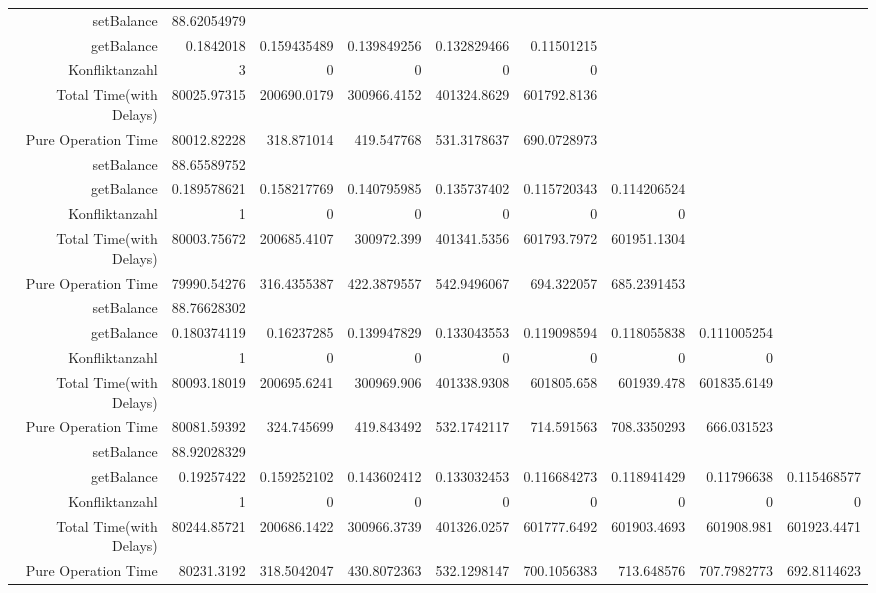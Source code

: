 \begin{landscape}
\begin{table}[htbp]
\begin{tabular}{rrrrrrrrr}
    \cline{1-9}
    setBalance & 88.62054979 &       &       &       &       &       &       &  \\
    getBalance & 0.1842018 & 0.159435489 & 0.139849256 & 0.132829466 & 0.11501215 &       &       &  \\
    Konfliktanzahl & 3     & 0     & 0     & 0     & 0     &       &       &  \\
    Total Time(with Delays) & 80025.97315 & 200690.0179 & 300966.4152 & 401324.8629 & 601792.8136 &       &       &  \\
    Pure Operation Time & 80012.82228 & 318.871014 & 419.547768 & 531.3178637 & 690.0728973 &       &       &  \\
\cline{1-9}    
    setBalance & 88.65589752 &       &       &       &       &       &       &  \\
    getBalance & 0.189578621 & 0.158217769 & 0.140795985 & 0.135737402 & 0.115720343 & 0.114206524 &       &  \\
    Konfliktanzahl & 1     & 0     & 0     & 0     & 0     & 0     &       &  \\
    Total Time(with Delays) & 80003.75672 & 200685.4107 & 300972.399 & 401341.5356 & 601793.7972 & 601951.1304 &       &  \\
    Pure Operation Time & 79990.54276 & 316.4355387 & 422.3879557 & 542.9496067 & 694.322057 & 685.2391453 &       &  \\
\cline{1-9}    
    setBalance & 88.76628302 &       &       &       &       &       &       &  \\
    getBalance & 0.180374119 & 0.16237285 & 0.139947829 & 0.133043553 & 0.119098594 & 0.118055838 & 0.111005254 &  \\
    Konfliktanzahl & 1     & 0     & 0     & 0     & 0     & 0     & 0     &  \\
    Total Time(with Delays) & 80093.18019 & 200695.6241 & 300969.906 & 401338.9308 & 601805.658 & 601939.478 & 601835.6149 &  \\
    Pure Operation Time & 80081.59392 & 324.745699 & 419.843492 & 532.1742117 & 714.591563 & 708.3350293 & 666.031523 &  \\
\cline{1-9}    
    setBalance & 88.92028329 &       &       &       &       &       &       &  \\
    getBalance & 0.19257422 & 0.159252102 & 0.143602412 & 0.133032453 & 0.116684273 & 0.118941429 & 0.11796638 & 0.115468577 \\
    Konfliktanzahl & 1     & 0     & 0     & 0     & 0     & 0     & 0     & 0 \\
    Total Time(with Delays) & 80244.85721 & 200686.1422 & 300966.3739 & 401326.0257 & 601777.6492 & 601903.4693 & 601908.981 & 601923.4471 \\
    Pure Operation Time & 80231.3192 & 318.5042047 & 430.8072363 & 532.1298147 & 700.1056383 & 713.648576 & 707.7982773 & 692.8114623 \\
    \bottomrule
    \end{tabular}%
  \label{tab:addlabel}%
\end{table}%
\end{landscape}


